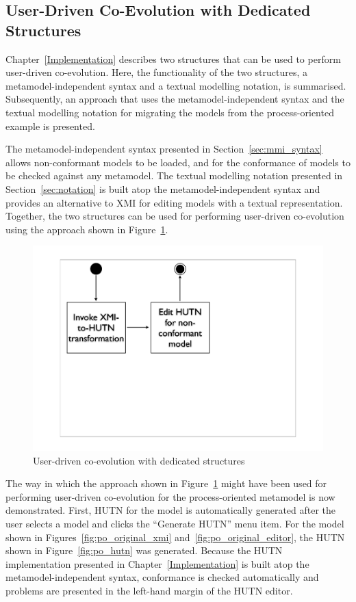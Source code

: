 \subsection{User-Driven Co-Evolution with Dedicated Structures}
\label{subsec:user-driven_co-evolution_with_dedicated_structures}

Chapter~\ref{Implementation} describes two structures that can be used to perform user-driven co-evolution. Here, the functionality of the two structures, a metamodel-independent syntax and a textual modelling notation, is summarised. Subsequently, an approach that uses the metamodel-independent syntax and the textual modelling notation for migrating the models from the process-oriented example is presented.

The metamodel-independent syntax presented in Section~\ref{sec:mmi_syntax} allows non-conformant models to be loaded, and for the conformance of models to be checked against any metamodel. The textual modelling notation presented in Section~\ref{sec:notation} is built atop the metamodel-independent syntax and provides an alternative to XMI for editing models with a textual representation. Together, the two structures can be used for performing user-driven co-evolution using the approach shown in Figure~\ref{fig:hutn_process}.

\begin{figure}[htbp]
	\centering
		\includegraphics[width=13.5cm]{6.Evaluation/images/user_driven/hutn_process.pdf}
	\caption{User-driven co-evolution with dedicated structures}
	\label{fig:hutn_process}
\end{figure}

The way in which the approach shown in Figure~\ref{fig:hutn_process} might have been used for performing user-driven co-evolution for the process-oriented metamodel is now demonstrated. First, HUTN for the model is automatically generated after the user selects a model and clicks the ``Generate HUTN'' menu item. For the model shown in Figures~\ref{fig:po_original_xmi} and~\ref{fig:po_original_editor}, the HUTN shown in Figure~\ref{fig:po_hutn} was generated. Because the HUTN implementation presented in Chapter~\ref{Implementation} is built atop the metamodel-independent syntax, conformance is checked automatically and problems are presented in the left-hand margin of the HUTN editor. 

